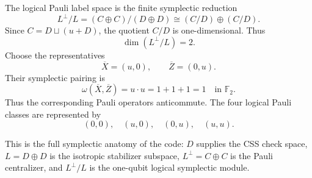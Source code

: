 The logical Pauli label space is the finite symplectic reduction
\[
  L^\perp/L
  =
  (C\oplus C)/(D\oplus D)
  \cong
  (C/D)\oplus(C/D).
\]
Since \(C=D\sqcup(u+D)\), the quotient \(C/D\) is one-dimensional. Thus
\[
  \dim(L^\perp/L)=2.
\]
Choose the representatives
\[
  \overline X=(u,0),\qquad \overline Z=(0,u).
\]
Their symplectic pairing is
\[
  \omega(\overline X,\overline Z)
  =
  u\cdot u
  =
  1+1+1
  =
  1
  \quad \text{in }\mathbb F_2.
\]
Thus the corresponding Pauli operators anticommute. The four logical Pauli
classes are represented by
\[
  (0,0),\quad (u,0),\quad (0,u),\quad (u,u).
\]

This is the full symplectic anatomy of the code: \(D\) supplies the CSS check
space, \(L=D\oplus D\) is the isotropic stabilizer subspace, \(L^\perp=C\oplus
C\) is the Pauli centralizer, and \(L^\perp/L\) is the one-qubit logical
symplectic module.
